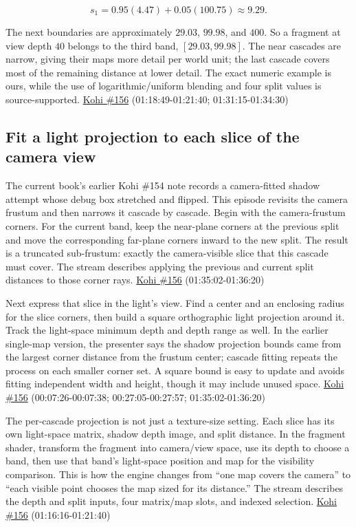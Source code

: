 \[s_1=0.95(4.47)+0.05(100.75)\approx9.29.\]

The next boundaries are approximately \(29.03\), \(99.98\), and \(400\). So a fragment at view depth \(40\) belongs to the third band, \([29.03,99.98]\). The near cascades are narrow, giving their maps more detail per world unit; the last cascade covers most of the remaining distance at lower detail. The exact numeric example is ours, while the use of logarithmic/uniform blending and four split values is source-supported. \href{https://www.youtube.com/watch?v=coWS_saBPBk}{Kohi \#156} (01:18:49-01:21:40; 01:31:15-01:34:30)

\subsection{Fit a light projection to each slice of the camera view}\label{06-engine-ii-ch026-fit-a-light-projection-to-each-slice-of-the-camera-view}

\hypertarget{06-engine-ii-ch026-fit-a-light-projection-to-each-slice-of-the-camera-view}{}

The current book's earlier Kohi \#154 note records a camera-fitted shadow attempt whose debug box stretched and flipped. This episode revisits the camera frustum and then narrows it cascade by cascade. Begin with the camera-frustum corners. For the current band, keep the near-plane corners at the previous split and move the corresponding far-plane corners inward to the new split. The result is a truncated sub-frustum: exactly the camera-visible slice that this cascade must cover. The stream describes applying the previous and current split distances to those corner rays. \href{https://www.youtube.com/watch?v=coWS_saBPBk}{Kohi \#156} (01:35:02-01:36:20)

Next express that slice in the light's view. Find a center and an enclosing radius for the slice corners, then build a square orthographic light projection around it. Track the light-space minimum depth and depth range as well. In the earlier single-map version, the presenter says the shadow projection bounds came from the largest corner distance from the frustum center; cascade fitting repeats the process on each smaller corner set. A square bound is easy to update and avoids fitting independent width and height, though it may include unused space. \href{https://www.youtube.com/watch?v=coWS_saBPBk}{Kohi \#156} (00:07:26-00:07:38; 00:27:05-00:27:57; 01:35:02-01:36:20)

The per-cascade projection is not just a texture-size setting. Each slice has its own light-space matrix, shadow depth image, and split distance. In the fragment shader, transform the fragment into camera/view space, use its depth to choose a band, then use that band's light-space position and map for the visibility comparison. This is how the engine changes from ``one map covers the camera'' to ``each visible point chooses the map sized for its distance.'' The stream describes the depth and split inputs, four matrix/map slots, and indexed selection. \href{https://www.youtube.com/watch?v=coWS_saBPBk}{Kohi \#156} (01:16:16-01:21:40)

